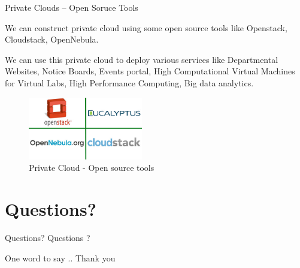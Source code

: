 \documentclass[xcolor=dvipsnames]{beamer}
\begin{document}
\begin{frame}{Private Clouds -- Open Soruce Tools}

We can construct private cloud using some open source tools like Openstack, Cloudstack, OpenNebula. \\

\hspace{4cm} 

We can use this private cloud to deploy various services like Departmental Websites, Notice Boards, Events portal, High Computational Virtual Machines for Virtual Labs, High Performance Computing, Big data analytics.
\begin{figure}[H]
 \centering
 \includegraphics[width=5cm]{./cloud.jpg}
 \caption{Private Cloud - Open source tools \label{fig:cloud} }
\end{figure}

\end{frame}

\section{Questions?}
\begin{frame}{Questions?}
\centering
Questions ?
\end{frame}


\begin{frame}{One word to say ..}
Thank you
\end{frame}
\end{document}

